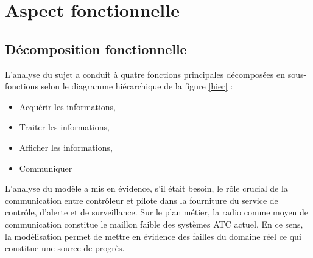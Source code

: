 \section{Aspect fonctionnelle}
	
	\subsection{Décomposition fonctionnelle}
	
	L'analyse du sujet a conduit à quatre fonctions principales décomposées en sous-fonctions selon le diagramme hiérarchique de la figure \ref{hier} :
	
	\begin{itemize}
		\item Acquérir les informations, 
		\item Traiter les informations,
		\item Afficher les informations,
		\item Communiquer
	\end{itemize}

L'analyse du modèle a mis en évidence, s'il était besoin, le rôle crucial
de la communication entre contrôleur et pilote dans la fourniture du service de contrôle, d'alerte et de surveillance. Sur le plan métier, la radio comme moyen de communication constitue le maillon faible des systèmes ATC actuel. En ce sens, la modélisation permet 
de mettre en évidence des failles du domaine réel ce qui constitue une source de progrès. 
	
